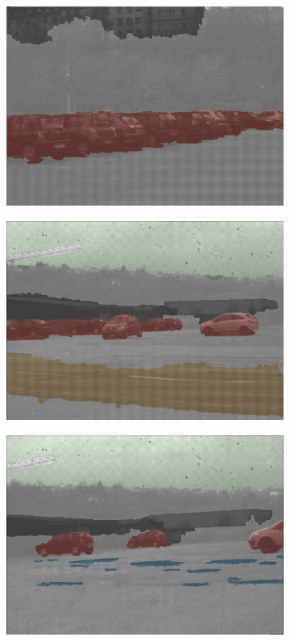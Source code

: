 \begin{figure}[h]
\begin{subfigure}[b]{0.18\linewidth}
		\includegraphics[width=\linewidth]{Figures/Aug/labels/overlayed/over4981.png}
	\end{subfigure}
	\begin{subfigure}[b]{0.18\linewidth}   
		\centering 
		\includegraphics[width=\linewidth]{Figures/Aug/labels/overlayed/over5142.png}
	\end{subfigure}
	\begin{subfigure}[b]{0.18\linewidth}   
		\centering 
		\includegraphics[width=\linewidth]{Figures/Aug/labels/overlayed/over5426.png}
	\end{subfigure}
	

\end{figure}
